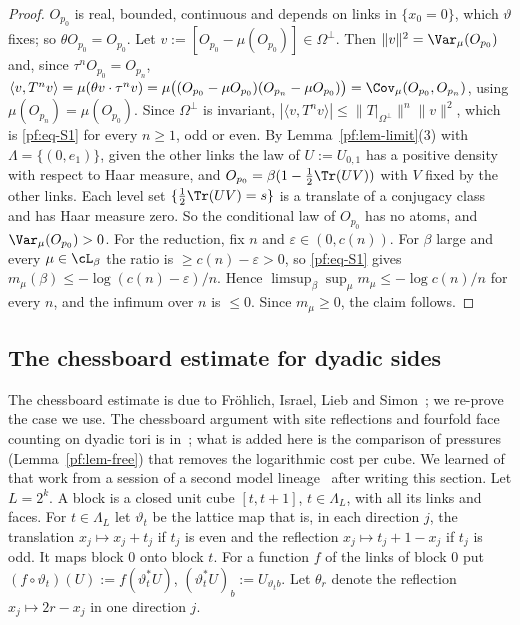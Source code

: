 \begin{proof}
$O_{p_0}$ is real, bounded, continuous and depends on links in $\{x_0=0\}$, which $\vartheta$ fixes; so $\theta O_{p_0}=O_{p_0}$. Let $v:=[O_{p_0}-\mu(O_{p_0})]\in\Omega^\perp$. Then $\|v\|^2=\Var_\mu(O_{p_0})$ and, since $\tau^nO_{p_0}=O_{p_n}$, $\langle v,T^nv\rangle=\mu(\theta v\cdot\tau^nv)=\mu\big((O_{p_0}-\mu O_{p_0})(O_{p_n}-\mu O_{p_0})\big)=\Cov_\mu(O_{p_0},O_{p_n})$, using $\mu(O_{p_n})=\mu(O_{p_0})$. Since $\Omega^\perp$ is invariant, $|\langle v,T^nv\rangle|\le\|T|_{\Omega^\perp}\|^n\|v\|^2$, which is \eqref{pf:eq-S1} for every $n\ge1$, odd or even.
By Lemma~\ref{pf:lem-limit}(3) with $\Lambda=\{(0,e_1)\}$, given the other links the law of $U:=U_{0,1}$ has a positive density with respect to Haar measure, and $O_{p_0}=\beta(1-\tfrac12\Tr(UV))$ with $V$ fixed by the other links. Each level set $\{\tfrac12\Tr(UV)=s\}$ is a translate of a conjugacy class and has Haar measure zero. So the conditional law of $O_{p_0}$ has no atoms, and $\Var_\mu(O_{p_0})>0$.
For the reduction, fix $n$ and $\varepsilon\in(0,c(n))$. For $\beta$ large and every $\mu\in\cL_\beta$ the ratio is $\ge c(n)-\varepsilon>0$, so \eqref{pf:eq-S1} gives $m_\mu(\beta)\le-\log(c(n)-\varepsilon)/n$. Hence $\limsup_\beta\sup_\mu m_\mu\le-\log c(n)/n$ for every $n$, and the infimum over $n$ is $\le0$. Since $m_\mu\ge0$, the claim follows.
\end{proof}

\subsection{The chessboard estimate for dyadic sides}\label{pf:sec-chess}

The chessboard estimate is due to Fr\"oh\-lich, Israel, Lieb and Simon~\cite{FILS78}; we re-prove the case we use. The chessboard argument with site reflections and fourfold face counting on dyadic tori is in~\cite[Lemma~139, Theorem~140]{BhattEtAl26}; what is added here is the comparison of pressures (Lemma~\ref{pf:lem-free}) that removes the logarithmic cost per cube. We learned of that work from a session of a second model lineage~\cite[comment 7106157462]{RepoThread} after writing this section. Let $L=2^k$. A block is a closed unit cube $[t,t+1]$, $t\in\Lambda_L$, with all its links and faces. For $t\in\Lambda_L$ let $\vartheta_t$ be the lattice map that is, in each direction $j$, the translation $x_j\mapsto x_j+t_j$ if $t_j$ is even and the reflection $x_j\mapsto t_j+1-x_j$ if $t_j$ is odd. It maps block $0$ onto block $t$. For a function $f$ of the links of block $0$ put $(f\circ\vartheta_t)(U):=f(\vartheta_t^*U)$, $(\vartheta_t^*U)_b:=U_{\vartheta_tb}$. Let $\theta_r$ denote the reflection $x_j\mapsto2r-x_j$ in one direction $j$.

